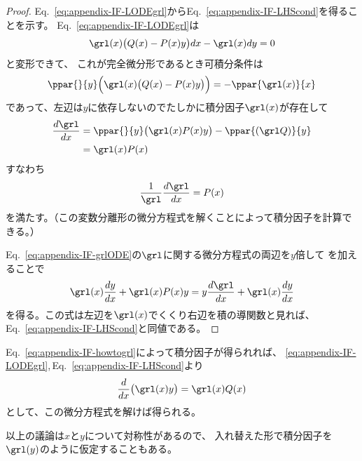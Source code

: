 \begin{proof}
  Eq.~\eqref{eq:appendix-IF-LODEgrl}からEq.~\eqref{eq:appendix-IF-LHScond}を得ることを示す。
  Eq.~\eqref{eq:appendix-IF-LODEgrl}は
  \begin{gather}
    \grl(x)\bigl(Q(x) - P(x)y\bigr)dx - \grl(x)dy = 0
  \end{gather}
  と変形できて、
  これが完全微分形であるとき可積分条件は
  \begin{gather}
    \ppar{}{y} \Bigl(\grl(x)\bigl(Q(x) - P(x)y\bigr)\Bigr) = - \ppar{\grl(x)}{x}
  \end{gather}
  であって、左辺は$y$に依存しないのでたしかに積分因子$\grl(x)$が存在して
  \begin{align}
    \frac{d\grl}{dx}
    &= \ppar{}{y}\bigl(\grl(x)P(x)y\bigr) - \ppar{(\grl Q)}{y} \\
    &= \grl(x)P(x) \label{eq:appendix-IF-grlODE}
  \end{align}
  すなわち
  \begin{gather}
    \frac{1}{\grl}\frac{d\grl}{dx} = P(x) \label{eq:appendix-IF-howtogrl}
  \end{gather}
  を満たす。（この変数分離形の微分方程式を解くことによって積分因子を計算できる。）

  Eq.~\eqref{eq:appendix-IF-grlODE}の$\grl$に関する微分方程式の両辺を$y$倍して
  を加えることで
  \begin{gather}
    \grl(x)\frac{dy}{dx} + \grl(x)P(x)y = y\frac{d\grl}{dx} + \grl(x)\frac{dy}{dx}
  \end{gather}
  を得る。この式は左辺を$\grl(x)$でくくり右辺を積の導関数と見れば、
  Eq.~\eqref{eq:appendix-IF-LHScond}と同値である。
\end{proof}

Eq.~\eqref{eq:appendix-IF-howtogrl}によって積分因子が得られれば、
\eqref{eq:appendix-IF-LODEgrl},\,Eq.~\eqref{eq:appendix-IF-LHScond}より
\begin{gather}
  \frac{d}{dx}\bigl(\grl(x)y\bigr) = \grl(x)Q(x)
\end{gather}
として、この微分方程式を解けば得られる。

以上の議論は$x$と$y$について対称性があるので、
入れ替えた形で積分因子を$\grl(y)$のように仮定することもある。
